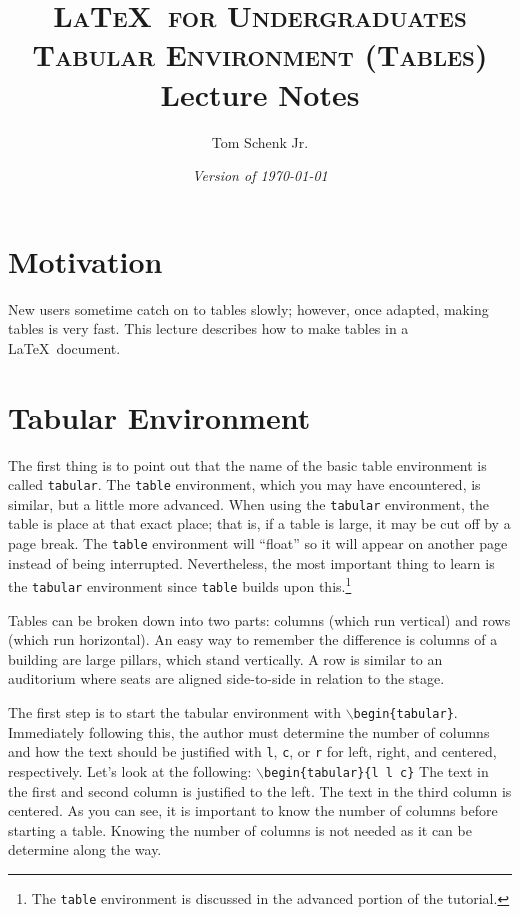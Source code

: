 \documentclass{article}
\title{\textsc{\LaTeX\ for Undergraduates\\
			Tabular Environment (Tables)} \\
			Lecture Notes}
\author{Tom Schenk Jr.}		%
\date{\textit{Version of \today}}
\begin{document}
\maketitle

\section{Motivation}

New users sometime catch on to tables slowly; however, once adapted, making tables is very fast. This lecture describes how to make tables in a \LaTeX\ document.

\section{Tabular Environment}

The first thing is to point out that the name of the basic table environment is called \texttt{tabular}. The \texttt{table} environment, which you may have encountered, is similar, but a little more advanced. When using the \texttt{tabular} environment, the table is place at that exact place; that is, if a table is large, it may be cut off by a page break. The \texttt{table} environment will ``float'' so it will appear on another page instead of being interrupted. Nevertheless, the most important thing to learn is the \texttt{tabular} environment since \texttt{table} builds upon this.\footnote{The \texttt{table} environment is discussed in the advanced portion of the tutorial.}

Tables can be broken down into two parts: columns (which run vertical) and rows (which run horizontal). An easy way to remember the difference is columns of a building are large pillars, which stand vertically. A row is similar to an auditorium where seats are aligned side-to-side in relation to the stage.

The first step is to start the tabular environment with \texttt{$\backslash$begin\{tabular\}}. Immediately following this, the author must determine the number of columns and how the text should be justified with \texttt{l}, \texttt{c}, or \texttt{r} for left, right, and centered, respectively. Let's look at the following:
\texttt{$\backslash$begin\{tabular\}\{l l c\}}
The text in the first and second column is justified to the left. The text in the third column is centered. As you can see, it is important to know the number of columns before starting a table. Knowing the number of columns is not needed as it can be determine along the way.
\end{document}
